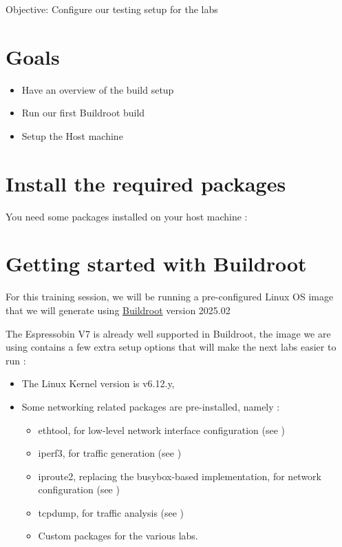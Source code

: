 {Objective: Configure our testing setup for the labs}

\section{Goals}

\begin{itemize}
\item Have an overview of the build setup
\item Run our first Buildroot build
\item Setup the Host machine
\end{itemize}

\section{Install the required packages}

You need some packages installed on your host machine :


\section{Getting started with Buildroot}

For this training session, we will be running a pre-configured Linux OS image that
we will generate using \href{https://buildroot.org/}{Buildroot} version 2025.02

The Espressobin V7 is already well supported in Buildroot, the image we are using
contains a few extra setup options that will make the next labs easier to run :

\begin{itemize}
	\item The Linux Kernel version is v6.12.y,
	\item Some networking related packages are pre-installed, namely :
		\begin{itemize}
			\item ethtool, for low-level network interface configuration (see )
			\item iperf3, for traffic generation (see \manpage{iperf3}{1})
			\item iproute2, replacing the busybox-based implementation, for network configuration (see )
			\item tcpdump, for traffic analysis (see \manpage{tcpdump}{8})
			\item Custom packages for the various labs.
		\end{itemize}
\end{itemize}

